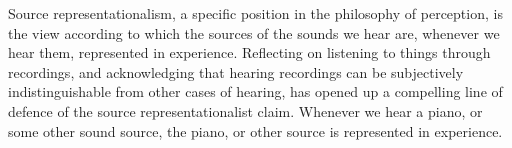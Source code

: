 \documentclass[sloppy, journal, git, bytitle, dodraft]{humapap}
\begin{document}
\sect  Source representationalism, a specific position in the philosophy of perception, is the view according to which the sources of the sounds we hear are, whenever we hear them, represented in experience. Reflecting on listening to things through recordings, and acknowledging that hearing recordings can be subjectively indistinguishable from other cases of hearing, has opened up a compelling line of defence of the source representationalist claim. Whenever we hear a piano, or some other sound source, the piano, or other source is represented in experience. 






\end{document}
